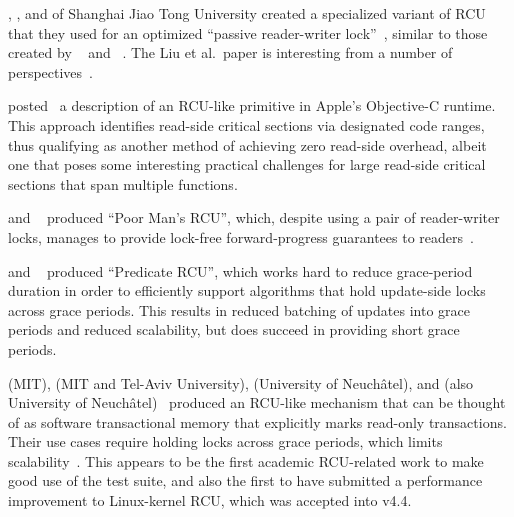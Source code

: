 , , and  of
Shanghai Jiao Tong University
created a specialized variant of RCU that they used for an optimized
``passive reader-writer lock''~\cite{RanLiu2014PassiveRWLock}, similar to
those created by ~\cite{GauthamShenoy2006RCUrwlock} and
~\cite{SrivatsaSBhat2014RCUrwlock}.
The Liu et al.~paper is interesting from a number of
perspectives~\cite{PaulEMcKenney2014ReadMostly}.

 posted~\cite{MikeAsh2015Apple} a description of an RCU-like
primitive in Apple's Objective-C runtime.
This approach identifies read-side critical sections via designated
code ranges, thus qualifying as another method of achieving
zero read-side overhead, albeit one that poses some interesting
practical challenges for large read-side critical sections that
span multiple functions.

 and ~\cite{PedroRmalhete2015PoorMansRCU}
produced ``Poor Man's RCU'', which, despite using a pair of reader-writer
locks, manages to provide lock-free forward-progress guarantees to
readers~\cite{PaulEMcKenney2015ReadMostly}.

 and ~\cite{Arbel:2015:PRR:2858788.2688518}
produced ``Predicate RCU'', which works hard to reduce grace-period
duration in order to efficiently support algorithms that hold
update-side locks across grace periods.
This results in reduced batching of updates into grace periods
and reduced scalability, but does succeed in providing short
grace periods.

\QuickQuizEnd

 (MIT),  (MIT and Tel-Aviv University),
 (University of Neuch\^{a}tel), and  (also
University of Neuch\^{a}tel)~\cite{Matveev:2015:RLS:2815400.2815406}
produced an RCU-like mechanism that can be thought of as
software transactional memory that explicitly marks
read-only transactions.
Their use cases require holding locks across grace periods, which limits
scalability~\cite{PaulEMcKenney2015ReadMostly,PaulEMcKenney2015ReadMostlySidebar}.
This appears to be the first academic RCU-related work to
make good use of the  test suite, and also the
first to have submitted a performance improvement to Linux-kernel
RCU, which was accepted into v4.4.

